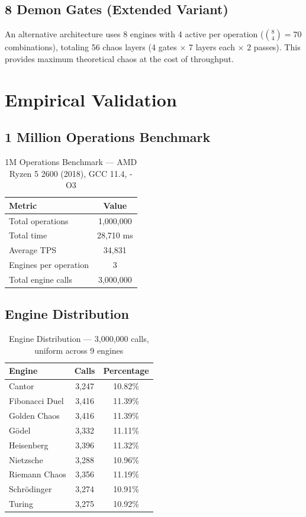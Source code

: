 \documentclass[11pt,a4paper]{article}
\begin{document}
\subsection{8 Demon Gates (Extended Variant)}

An alternative architecture uses 8 engines with 4 active per operation ($\binom{8}{4} = 70$ combinations), totaling 56 chaos layers (4 gates $\times$ 7 layers each $\times$ 2 passes). This provides maximum theoretical chaos at the cost of throughput.

\section{Empirical Validation}

\subsection{1 Million Operations Benchmark}

\begin{table}[h]
\centering
\begin{tabular}{|l|c|}
\hline
\textbf{Metric} & \textbf{Value} \\
\hline
Total operations & 1,000,000 \\
Total time & 28,710 ms \\
Average TPS & 34,831 \\
Engines per operation & 3 \\
Total engine calls & 3,000,000 \\
\hline
\end{tabular}
\caption{1M Operations Benchmark — AMD Ryzen 5 2600 (2018), GCC 11.4, -O3}
\end{table}

\subsection{Engine Distribution}

\begin{table}[h]
\centering
\begin{tabular}{|l|c|c|}
\hline
\textbf{Engine} & \textbf{Calls} & \textbf{Percentage} \\
\hline
Cantor & 3,247 & 10.82\% \\
Fibonacci Duel & 3,416 & 11.39\% \\
Golden Chaos & 3,416 & 11.39\% \\
G\"odel & 3,332 & 11.11\% \\
Heisenberg & 3,396 & 11.32\% \\
Nietzsche & 3,288 & 10.96\% \\
Riemann Chaos & 3,356 & 11.19\% \\
Schr\"odinger & 3,274 & 10.91\% \\
Turing & 3,275 & 10.92\% \\
\hline
\end{tabular}
\caption{Engine Distribution — 3,000,000 calls, uniform across 9 engines}
\end{table}
\end{document}
